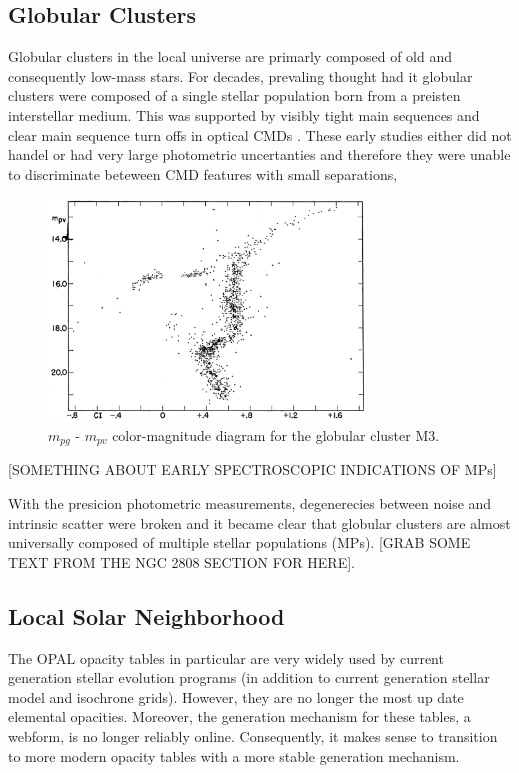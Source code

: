 \subsection{Globular Clusters}

Globular clusters in the local universe are primarly composed of old and
consequently low-mass stars. For decades, prevaling thought had it globular
clusters were composed of a single stellar population born from a preisten
interstellar medium. This was supported by visibly tight main sequences and
clear main sequence turn offs in optical CMDs \citep[Figure
\ref{fig:M3CMD}][]{Sandage1953}. These early studies either did not handel or
had very large photometric uncertanties and therefore they were unable to
discriminate beteween CMD features with small separations,

\begin{figure}
	\centering
	\includegraphics[width=0.75\textwidth]{src/Figures/Gould53.png}
	\caption{$m_{pg}$ - $m_{pv}$ color-magnitude diagram for the globular cluster M3.}
	\label{fig:M3CMD}
\end{figure}

[SOMETHING ABOUT EARLY SPECTROSCOPIC INDICATIONS OF MPs]

With the presicion photometric measurements, degenerecies between noise and
intrinsic scatter were broken and it became clear that globular clusters are
almost universally composed of multiple stellar populations (MPs). [GRAB SOME
TEXT FROM THE NGC 2808 SECTION FOR HERE].

\subsection{Local Solar Neighborhood}

The OPAL opacity tables in particular are very widely used by current
generation stellar evolution programs (in addition to current generation
stellar model and isochrone grids). However, they are no longer the most up
date elemental opacities. Moreover, the generation mechanism for these tables,
a webform, is no longer reliably online.  Consequently, it makes sense to
transition to more modern opacity tables with a more stable generation
mechanism.

